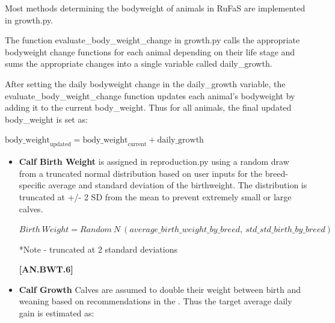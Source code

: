 \documentclass{article}
\begin{document}
\begin{refsection}
    Most methods determining the bodyweight of animals in RuFaS are implemented in growth.py. 
    
    The function evaluate\_body\_weight\_change in growth.py calls the appropriate bodyweight change functions for each animal depending on their life stage and sums the appropriate changes into a single variable called daily\_growth. 

    After setting the daily bodyweight change in the daily\_growth variable, the evaluate\_body\_weight\_change function updates each animal's bodyweight by adding it to the current body\_weight. Thus for all animals, the final updated body\_weight is set as:
    \vspace{0.25cm}
    
    \begin{center}
    \(\text{body\_weight}_{\text{updated}} = \text{body\_weight}_{\text{current}} + \text{daily\_growth}\)        
    \end{center}

\begin{itemize}
    \item \textbf{Calf Birth Weight} is assigned in reproduction.py using a random draw from a truncated normal distribution based on user inputs for the breed-specific average and standard deviation of the birthweight. The distribution is truncated at +/- 2 SD from the mean to prevent extremely small or large calves. 
    \vspace{0.5cm}
    
\begin{center}
    \(Birth\ Weight = Random\ N\ (average\_birth\_weight\_by\_breed,\ std\_std\_birth\_by\_breed)\) 
    
    *Note - truncated at 2 standard deviations
\end{center}
    \vspace{0.5cm}
    
    {\raggedleft \textbf{[AN.BWT.6]}\par}
    \vspace{0.5cm}

    \item \textbf{Calf Growth} Calves are assumed to double their weight between birth and weaning based on recommendations in the \cite{nrc2001}. Thus the target average daily gain is estimated as:
    \vspace{0.5cm}

\begin{center}
    

\end{center}
\end{itemize}
\end{refsection}
\end{document}
